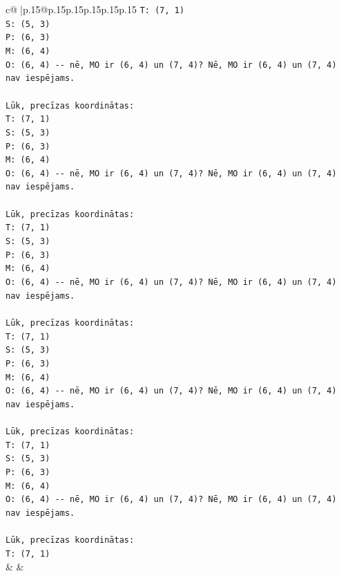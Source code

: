 \documentclass{article}
\begin{document}
{\begin{supertabular}{c@{$\;$}|p{.15\linewidth}@{}p{.15\linewidth}p{.15\linewidth}p{.15\linewidth}p{.15\linewidth}p{.15\linewidth}}
{{{\texttt{T: (7, 1)} \\
\texttt{S: (5, 3)} \\
\texttt{P: (6, 3)} \\
\texttt{M: (6, 4)} \\
\texttt{O: (6, 4) {-}{-} nē, MO ir (6, 4) un (7, 4)? Nē, MO ir (6, 4) un (7, 4) nav iespējams.} \\
\\ 
\texttt{Lūk, precīzas koordinātas:} \\
\texttt{T: (7, 1)} \\
\texttt{S: (5, 3)} \\
\texttt{P: (6, 3)} \\
\texttt{M: (6, 4)} \\
\texttt{O: (6, 4) {-}{-} nē, MO ir (6, 4) un (7, 4)? Nē, MO ir (6, 4) un (7, 4) nav iespējams.} \\
\\ 
\texttt{Lūk, precīzas koordinātas:} \\
\texttt{T: (7, 1)} \\
\texttt{S: (5, 3)} \\
\texttt{P: (6, 3)} \\
\texttt{M: (6, 4)} \\
\texttt{O: (6, 4) {-}{-} nē, MO ir (6, 4) un (7, 4)? Nē, MO ir (6, 4) un (7, 4) nav iespējams.} \\
\\ 
\texttt{Lūk, precīzas koordinātas:} \\
\texttt{T: (7, 1)} \\
\texttt{S: (5, 3)} \\
\texttt{P: (6, 3)} \\
\texttt{M: (6, 4)} \\
\texttt{O: (6, 4) {-}{-} nē, MO ir (6, 4) un (7, 4)? Nē, MO ir (6, 4) un (7, 4) nav iespējams.} \\
\\ 
\texttt{Lūk, precīzas koordinātas:} \\
\texttt{T: (7, 1)} \\
\texttt{S: (5, 3)} \\
\texttt{P: (6, 3)} \\
\texttt{M: (6, 4)} \\
\texttt{O: (6, 4) {-}{-} nē, MO ir (6, 4) un (7, 4)? Nē, MO ir (6, 4) un (7, 4) nav iespējams.} \\
\\ 
\texttt{Lūk, precīzas koordinātas:} \\
\texttt{T: (7, 1)} \\
            }
        }
    }
    & & \\ \\


\end{supertabular}}
\end{document}
